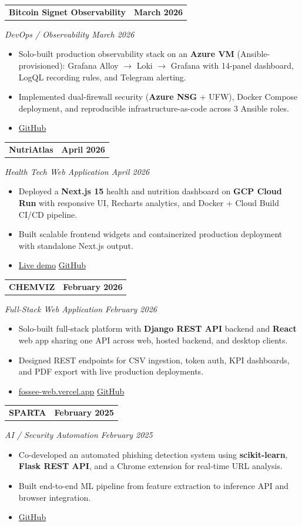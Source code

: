 \documentclass[11pt,a4paper]{article}
\makeatletter
\newcommand{\resumeProjectTitle}[2]{%
  \vspace{4pt}
  \noindent
  \begin{tabular*}{\textwidth}{@{}l@{\extracolsep{\fill}}r@{}}
    \textbf{#1} & \textbf{#2} \\
  \end{tabular*}%
}
\newcommand{\resumeProjectSubtitle}[1]{%
  \noindent\textit{#1}\vspace{2pt}%
}
\makeatother
\begin{document}
\resumeProjectTitle{Bitcoin Signet Observability}{March 2026}
\resumeProjectSubtitle{DevOps / Observability \textperiodcentered{} March 2026}
\begin{itemize}
  \item Solo-built production observability stack on an \textbf{Azure VM} (Ansible-provisioned): Grafana Alloy $\rightarrow$ Loki $\rightarrow$ Grafana with 14-panel dashboard, LogQL recording rules, and Telegram alerting.
  \item Implemented dual-firewall security (\textbf{Azure NSG} + UFW), Docker Compose deployment, and reproducible infrastructure-as-code across 3 Ansible roles.
  \item \href{https://github.com/pracheersrivastava/bitcoin-monitoring}{GitHub}
\end{itemize}

\resumeProjectTitle{NutriAtlas}{April 2026}
\resumeProjectSubtitle{Health Tech Web Application \textperiodcentered{} April 2026}
\begin{itemize}
  \item Deployed a \textbf{Next.js 15} health and nutrition dashboard on \textbf{GCP Cloud Run} with responsive UI, Recharts analytics, and Docker + Cloud Build CI/CD pipeline.
  \item Built scalable frontend widgets and containerized production deployment with standalone Next.js output.
  \item \href{https://h2s-health-727128096395.asia-south1.run.app/}{Live demo} \textbar{} \href{https://github.com/pracheersrivastava/NutriAtlas}{GitHub}
\end{itemize}

\resumeProjectTitle{CHEM{\textbullet}VIZ}{February 2026}
\resumeProjectSubtitle{Full-Stack Web Application \textperiodcentered{} February 2026}
\begin{itemize}
  \item Solo-built full-stack platform with \textbf{Django REST API} backend and \textbf{React} web app sharing one API across web, hosted backend, and desktop clients.
  \item Designed REST endpoints for CSV ingestion, token auth, KPI dashboards, and PDF export with live production deployments.
  \item \href{https://fossee-web.vercel.app}{fossee-web.vercel.app} \textbar{} \href{https://github.com/pracheersrivastava/fossee-web}{GitHub}
\end{itemize}

\resumeProjectTitle{SPARTA}{February 2025}
\resumeProjectSubtitle{AI / Security Automation \textperiodcentered{} February 2025}
\begin{itemize}
  \item Co-developed an automated phishing detection system using \textbf{scikit-learn}, \textbf{Flask REST API}, and a Chrome extension for real-time URL analysis.
  \item Built end-to-end ML pipeline from feature extraction to inference API and browser integration.
  \item \href{https://github.com/pracheersrivastava/SPARTA_Extension}{GitHub}
\end{itemize}
\end{document}
